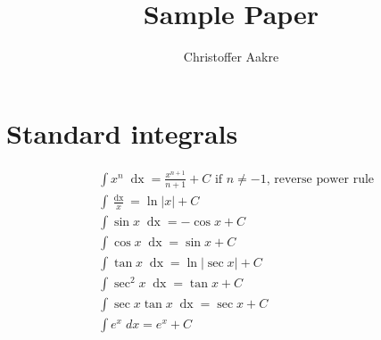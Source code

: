 \documentclass{templates/paper}
\title{Sample Paper}
\author{Christoffer Aakre}
\newcommand{\dx}{\mathop{dx}}
\begin{document}
\section*{\centering Standard integrals}
\begin{align*}
    &\int x^n \; \dx = \frac{x^{n + 1}}{n + 1} + C \text{ if $n \neq -1$, reverse power rule} \\
    &\int \frac{\dx}{x} = \ln \lvert x \rvert + C \\
    &\int \sin x \; \dx = -\cos x + C \\
    &\int \cos x \; \dx = \sin x + C \\
    &\int \tan x \; \dx = \ln \lvert \sec x \rvert + C \\
    &\int \sec^2 x \; \dx = \tan x + C \\
    &\int \sec x \tan x \; \dx = \sec x + C \\
    &\int e^x \; dx = e^x + C \\
\end{align*}
\end{document}
